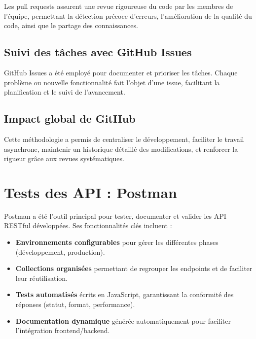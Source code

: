 \documentclass[12pt]{rapportPfe}
\begin{document}
Les pull requests assurent une revue rigoureuse du code par les membres de l’équipe, permettant la détection précoce d’erreurs, l’amélioration de la qualité du code, ainsi que le partage des connaissances.

\subsection{Suivi des tâches avec GitHub Issues}

GitHub Issues a été employé pour documenter et prioriser les tâches. Chaque problème ou nouvelle fonctionnalité fait l’objet d’une issue, facilitant la planification et le suivi de l’avancement.

\subsection{Impact global de GitHub}

Cette méthodologie a permis de centraliser le développement, faciliter le travail asynchrone, maintenir un historique détaillé des modifications, et renforcer la rigueur grâce aux revues systématiques.

\section{Tests des API : Postman}

Postman a été l’outil principal pour tester, documenter et valider les API RESTful développées. Ses fonctionnalités clés incluent :

\begin{itemize}
    \item \textbf{Environnements configurables} pour gérer les différentes phases (développement, production).
    \item \textbf{Collections organisées} permettant de regrouper les endpoints et de faciliter leur réutilisation.
    \item \textbf{Tests automatisés} écrits en JavaScript, garantissant la conformité des réponses (statut, format, performance).
    \item \textbf{Documentation dynamique} générée automatiquement pour faciliter l’intégration frontend/backend.
\end{itemize}
\end{document}
